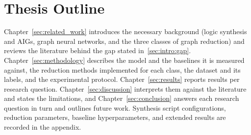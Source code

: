 \section{Thesis Outline}
\label{sec:intro:outline}
Chapter~\ref{sec:related_work} introduces the necessary background (logic synthesis and
AIGs, graph neural networks, and the three classes of graph reduction) and reviews the
literature behind the gap stated in~\ref{sec:intro:gap}. Chapter~\ref{sec:methodology}
describes the model and the baselines it is measured against, the reduction methods
implemented for each class, the dataset and its labels, and the experimental protocol.
Chapter~\ref{sec:results} reports results per research question.
Chapter~\ref{sec:discussion} interprets them against the literature and states the
limitations, and Chapter~\ref{sec:conclusion} answers each research question in turn and
outlines future work. Synthesis script configurations, reduction parameters, baseline
hyperparameters, and extended results are recorded in the appendix.

